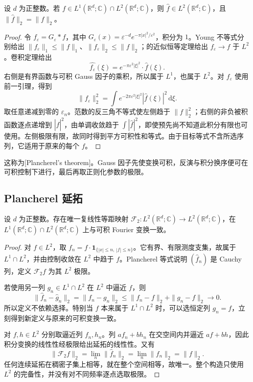 \begin{theorem}\label{b2:thm:04-plancherel-core}
设 \(d\) 为正整数。若 \(f\in L^1(\mathbb R^d;\mathbb C)\cap L^2(\mathbb R^d;\mathbb C)\)，则 \(\widehat f\in L^2(\mathbb R^d;\mathbb C)\)，且 \(\|\widehat f\|_2=\|f\|_2\)。
\end{theorem}
\begin{proof}
令 \(f_\varepsilon=G_\varepsilon*f\)，其中 \(G_\varepsilon(x)=\varepsilon^{-d}e^{-\pi|x|^2/\varepsilon^2}\)，积分为 \(1\)。Young 不等式分别给出 \(\|f_\varepsilon\|_1\leq\|f\|_1\)、\(\|f_\varepsilon\|_2\leq\|f\|_2\)；的近似恒等定理给出 \(f_\varepsilon\to f\) 于 \(L^2\)。卷积定理给出
\[
 \widehat {f_\varepsilon}(\xi)
 =e^{-\pi\varepsilon^2|\xi|^2}\cdot\widehat f(\xi).
\]
右侧是有界函数与可积 Gauss 因子的乘积，所以属于 \(L^1\)，也属于 \(L^2\)。对 \(f_\varepsilon\) 使用前一引理，得到
\[
 \|f_\varepsilon\|_2^2
 =\int e^{-2\pi\varepsilon^2|\xi|^2}|\widehat f(\xi)|^2\,\mathrm{d}\xi.
\]
取任意递减到零的 \(\varepsilon_n\)。范数的反三角不等式使左侧趋于 \(\|f\|_2^2\)；右侧的非负被积函数逐点递增到 \(|\widehat f|^2\)，由单调收敛趋于 \(\int|\widehat f|^2\)，即使预先尚不知道此积分有限也可使用。左侧极限有限，故同时得到平方可积性和等式。由于目标等式不含所选序列，它适用于原来的每个 \(f\)。
\end{proof}

这称为[Plancherel's theorem]。Gauss 因子先使变换可积，反演与积分换序便可在可积控制下进行，最后再取正则化参数的极限。

\subsection{Plancherel 延拓}
\label{b2:subsec:040102}

\begin{theorem}\label{b2:thm:04-plancherel-extension}
设 \(d\) 为正整数。存在唯一复线性等距映射 \(\mathcal F_2:L^2(\mathbb R^d;\mathbb C)\to L^2(\mathbb R^d;\mathbb C)\)，在 \(L^1(\mathbb R^d;\mathbb C)\cap L^2(\mathbb R^d;\mathbb C)\) 上与可积 Fourier 变换一致。
\end{theorem}
\begin{proof}
对 \(f\in L^2\)，取 \(f_n=f\cdot\mathbf1_{\{|x|\leq n,\ |f|\leq n\}}\)。它有界、有限测度支集，故属于 \(L^1\cap L^2\)，并由控制收敛在 \(L^2\) 中趋于 \(f\)。Plancherel 等式说明 \((\widehat f_n)\) 是 Cauchy 列，定义 \(\mathcal F_2f\) 为其 \(L^2\) 极限。

若使用另一列 \(g_n\in L^1\cap L^2\) 在 \(L^2\) 中逼近 \(f\)，则
\[
 \|\widehat f_n-\widehat g_n\|_2
 =\|f_n-g_n\|_2
 \leq\|f_n-f\|_2+\|g_n-f\|_2\longrightarrow0.
\]
所以定义不依赖选择。特别当 \(f\) 本来属于 \(L^1\cap L^2\) 时，可以选恒定列 \(g_n=f\)，立刻得到新定义与原来的可积变换一致。

对 \(f,h\in L^2\) 分别取逼近列 \(f_n,h_n\)。列 \(af_n+bh_n\) 在交空间内并逼近 \(af+bh\)，因此积分变换的线性性经极限给出延拓的线性性。又有
\[
 \|\mathcal F_2f\|_2
 =\lim_n\|\widehat f_n\|_2
 =\lim_n\|f_n\|_2=\|f\|_2.
\]
任何连续延拓在稠密子集上相等，就在整个空间相等，故唯一。整个构造只使用 \(L^2\) 的完备性，并没有对不同频率逐点选取极限。
\end{proof}

